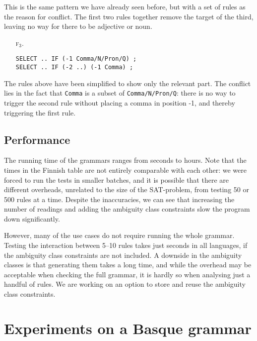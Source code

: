 {{This is the same pattern we have already seen before, but with a set of rules as the reason for conflict.
The first two rules together remove the target of the third, leaving no way for there to be adjective or noun.

\begin{itemize}
\item[\textsc{f$_3$.}]\begin{verbatim}
SELECT .. IF (-1 Comma/N/Pron/Q) ;
SELECT .. IF (-2 ..) (-1 Comma) ;
\end{verbatim}
\end{itemize}

The rules above have been simplified to show only the relevant part.
The conflict lies in the fact that \texttt{Comma} is a subset of \texttt{Comma/N/Pron/Q}:
there is no way to trigger the second rule without placing a comma in position -1, and thereby triggering the first rule.


\subsection{Performance} 
The running time of the grammars ranges from seconds to hours. 
Note that the times in the Finnish table are not entirely comparable with each other: we were forced to run the tests in smaller batches, and it is possible that there are different overheads, unrelated to the size of the SAT-problem, from testing 50 or 500 rules at a time. 
Despite the inaccuracies, we can see that increasing the number of readings 
and adding the ambiguity class constraints
slow the program down significantly.

However, many of the use cases do not require running the whole
grammar. Testing the interaction between 5--10 rules takes just
seconds in all languages, if the ambiguity class constraints are not included. 
A downside in the ambiguity classes is that generating them takes a long time, 
and while the overhead may be acceptable when checking the full grammar,
it is hardly so when analysing just a handful of rules. 
We are working on an option to store and reuse the ambiguity class constraints.

\section{Experiments on a Basque grammar}
\label{sec:basqueEval}

}}
